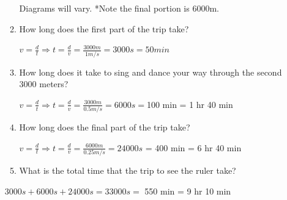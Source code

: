 \documentclass[letterpaper, 12pt]{article}
\begin{document}
\begin{enumerate}
\begin{enumerate}
\begin{center} Diagrams will vary.  *Note the final portion is 6000m.
\end{center}


\vspace{0.15in}
\color{black}

	\item How long does the first part of the trip take?
\color{red}

\begin{center} $ v = \frac{d}{t} \Longrightarrow t = \frac{d}{v} = \frac{3000 m}{1 m/s} = 3000 s = 50 min$ 
	
\end{center}


\vspace{0.15in}
\color{black}



	\item How long does it take to sing and dance your way through the second 3000 meters? 
\color{red}

\begin{center} $ v = \frac{d}{t} \Longrightarrow t = \frac{d}{v} = \frac{3000m}{0.5 m/s} = 6000s = $100 min = 1 hr 40 min
	
\end{center}


\vspace{0.15in}
\color{black}
	\item How long does the final part of the trip take?
\color{red}

\begin{center} $ v = \frac{d}{t} \Longrightarrow t = \frac{d}{v} = \frac{6000m}{0.25 m/s} = 24000s $ = 400 min = 6 hr 40 min
	
\end{center}


\vspace{0.15in}
\color{black}

	\item What is the total time that the trip to see the ruler take?
\end{enumerate}

\color{red}

\begin{center} $ 3000s + 6000s + 24000s =  33000 s = $ 550 min = 9 hr 10 min
	
\end{center}


\vspace{0.15in}
\color{black}


\end{enumerate}
\end{document}
